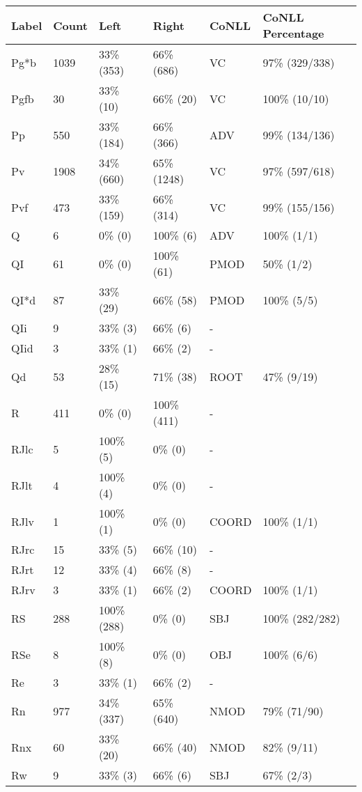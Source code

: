 \begin{figure*}
\begin{tabular}{|l|l|l|l||l|l|}
\hline
Label & Count & Left & Right & CoNLL & CoNLL Percentage\\ 
\hline
 Pg*b & 1039 & 33\% (353) & 66\% (686) & VC & 97\% (329/338) \\ 
\hline
 Pgfb & 30 & 33\% (10) & 66\% (20) & VC & 100\% (10/10) \\ 
\hline
 Pp & 550 & 33\% (184) & 66\% (366) & ADV & 99\% (134/136) \\ 
\hline
 Pv & 1908 & 34\% (660) & 65\% (1248) & VC & 97\% (597/618) \\ 
\hline
 Pvf & 473 & 33\% (159) & 66\% (314) & VC & 99\% (155/156) \\ 
\hline
 Q & 6 & 0\% (0) & 100\% (6) & ADV & 100\% (1/1) \\ 
\hline
 QI & 61 & 0\% (0) & 100\% (61) & PMOD & 50\% (1/2) \\ 
\hline
 QI*d & 87 & 33\% (29) & 66\% (58) & PMOD & 100\% (5/5) \\ 
\hline
 QIi & 9 & 33\% (3) & 66\% (6) & - &  \\ 
\hline
 QIid & 3 & 33\% (1) & 66\% (2) & - &  \\ 
\hline
 Qd & 53 & 28\% (15) & 71\% (38) & ROOT & 47\% (9/19) \\ 
\hline
 R & 411 & 0\% (0) & 100\% (411) & - &  \\ 
\hline
 RJlc & 5 & 100\% (5) & 0\% (0) & - &  \\ 
\hline
 RJlt & 4 & 100\% (4) & 0\% (0) & - &  \\ 
\hline
 RJlv & 1 & 100\% (1) & 0\% (0) & COORD & 100\% (1/1) \\ 
\hline
 RJrc & 15 & 33\% (5) & 66\% (10) & - &  \\ 
\hline
 RJrt & 12 & 33\% (4) & 66\% (8) & - &  \\ 
\hline
 RJrv & 3 & 33\% (1) & 66\% (2) & COORD & 100\% (1/1) \\ 
\hline
 RS & 288 & 100\% (288) & 0\% (0) & SBJ & 100\% (282/282) \\ 
\hline
 RSe & 8 & 100\% (8) & 0\% (0) & OBJ & 100\% (6/6) \\ 
\hline
 Re & 3 & 33\% (1) & 66\% (2) & - &  \\ 
\hline
 Rn & 977 & 34\% (337) & 65\% (640) & NMOD & 79\% (71/90) \\ 
\hline
 Rnx & 60 & 33\% (20) & 66\% (40) & NMOD & 82\% (9/11) \\ 
\hline
 Rw & 9 & 33\% (3) & 66\% (6) & SBJ & 67\% (2/3) \\ 

\end{tabular}
\end{figure*}
